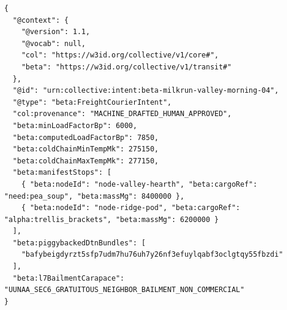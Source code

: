 \begin{lstlisting}[language=jsonld,caption={Canonical Wave B \texttt{FreightCourierIntent} bundling physical tiffins, shop parts, and offline Domain-B DTN sneakernet sync onto a single cargo-trike milk-run.}]
{
  "@context": {
    "@version": 1.1,
    "@vocab": null,
    "col": "https://w3id.org/collective/v1/core#",
    "beta": "https://w3id.org/collective/v1/transit#"
  },
  "@id": "urn:collective:intent:beta-milkrun-valley-morning-04",
  "@type": "beta:FreightCourierIntent",
  "col:provenance": "MACHINE_DRAFTED_HUMAN_APPROVED",
  "beta:minLoadFactorBp": 6000,
  "beta:computedLoadFactorBp": 7850,
  "beta:coldChainMinTempMk": 275150,
  "beta:coldChainMaxTempMk": 277150,
  "beta:manifestStops": [
    { "beta:nodeId": "node-valley-hearth", "beta:cargoRef": "need:pea_soup", "beta:massMg": 8400000 },
    { "beta:nodeId": "node-ridge-pod", "beta:cargoRef": "alpha:trellis_brackets", "beta:massMg": 6200000 }
  ],
  "beta:piggybackedDtnBundles": [
    "bafybeigdyrzt5sfp7udm7hu76uh7y26nf3efuylqabf3oclgtqy55fbzdi"
  ],
  "beta:l7BailmentCarapace": "UUNAA_SEC6_GRATUITOUS_NEIGHBOR_BAILMENT_NON_COMMERCIAL"
}
\end{lstlisting}

\begin{table}[htbp]
\centering
\caption{Wave B Layer~6 Constellation Surfaces, Coalesced Workflow Density, and SI Invariants Across Stages 1A--3}
\label{tab:wave-b-summary}
\small
{}
\end{table}

